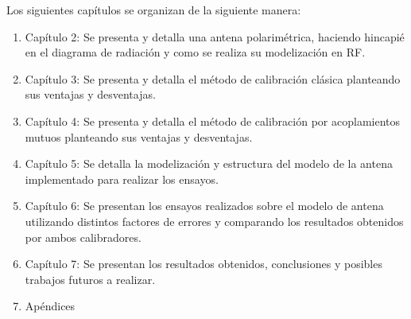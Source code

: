 Los siguientes capítulos se organizan de la siguiente manera:

\begin{enumerate}
	\item Capítulo 2: Se presenta y detalla una antena polarimétrica, haciendo hincapié en el diagrama de radiación y como
    se realiza su modelización en RF.
	\item Capítulo 3: Se presenta y detalla el método de calibración clásica planteando sus ventajas y desventajas.
	\item Capítulo 4: Se presenta y detalla el método de calibración por acoplamientos mutuos planteando sus ventajas y
		desventajas.
	\item Capítulo 5: Se detalla la modelización y estructura del modelo de la antena implementado para realizar los ensayos.
	\item Capítulo 6: Se presentan los ensayos realizados sobre el modelo de antena utilizando distintos factores de errores y
		comparando los resultados obtenidos por ambos calibradores.
	\item Capítulo 7: Se presentan los resultados obtenidos, conclusiones y posibles trabajos futuros a realizar.
	\item Apéndices
\end{enumerate}

